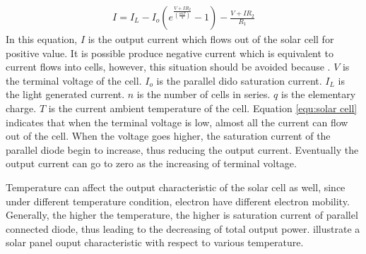 \begin{eqnarray}\label{equ:solar cell}
    I = I_L - I_o(e^{\frac{V+IR_2}{(\frac{nkT}{q})}} - 1) - \frac{V+IR_2}{R_1}
\end{eqnarray}
In this equation, $I$ is the output current which flows out of the solar cell for positive value. It is possible produce negative current which is equivalent to current flows into cells, however, this situation should be avoided because .  $V$ is the terminal voltage of the cell. $I_o$ is the parallel dido saturation current. $I_L$ is the light generated current. $n$ is the number of cells in series. $q$ is the elementary charge. $T$ is the current ambient temperature of the cell. Equation \ref{equ:solar cell} indicates that when the terminal voltage is low, almost all the current can flow out of the cell. When the voltage goes higher, the saturation current of the parallel diode begin to increase, thus reducing the output current. Eventually the output current can go to zero as the increasing of terminal voltage. 

Temperature can affect the output characteristic of the solar cell as well, since under different temperature condition, electron have different electron mobility. Generally, the higher the temperature, the higher is saturation current of parallel connected diode, thus leading to the decreasing of total output power.  illustrate a solar panel ouput characteristic with respect to various temperature. 

